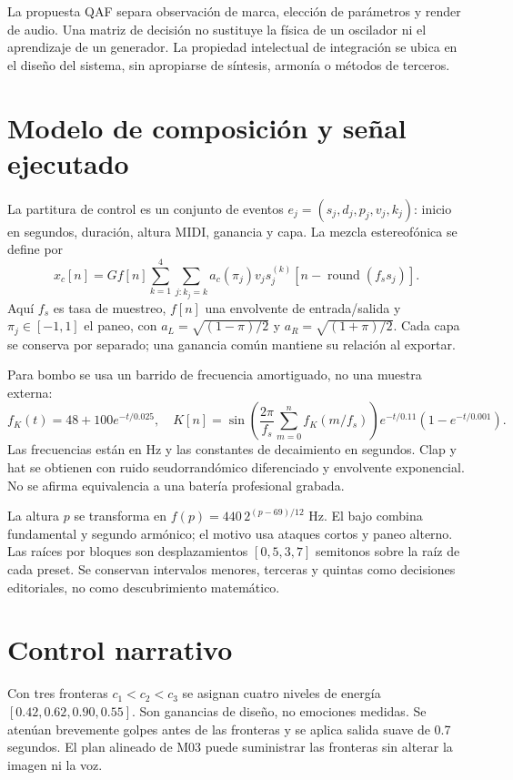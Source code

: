 \documentclass[11pt,a4paper]{article}
\begin{document}
La propuesta QAF separa observación de marca, elección de parámetros y render de audio. Una matriz de decisión no sustituye la física de un oscilador ni el aprendizaje de un generador. La propiedad intelectual de integración se ubica en el diseño del sistema, sin apropiarse de síntesis, armonía o métodos de terceros.

\newpage
\section{Modelo de composición y señal ejecutado}
La partitura de control es un conjunto de eventos $e_j=(s_j,d_j,p_j,v_j,k_j)$: inicio en segundos, duración, altura MIDI, ganancia y capa. La mezcla estereofónica se define por
\begin{equation}
 x_c[n]=G f[n]\sum_{k=1}^4\sum_{j:k_j=k}a_c(\pi_j)v_j
 s_j^{(k)}[n-\operatorname{round}(f_s s_j)].
\end{equation}
Aquí $f_s$ es tasa de muestreo, $f[n]$ una envolvente de entrada/salida y $\pi_j\in[-1,1]$ el paneo, con $a_L=\sqrt{(1-\pi)/2}$ y $a_R=\sqrt{(1+\pi)/2}$. Cada capa se conserva por separado; una ganancia común mantiene su relación al exportar.

Para bombo se usa un barrido de frecuencia amortiguado, no una muestra externa:
\begin{equation}
 f_K(t)=48+100e^{-t/0.025},\quad
 K[n]=\sin\!\left(\frac{2\pi}{f_s}\sum_{m=0}^{n}f_K(m/f_s)\right)e^{-t/0.11}(1-e^{-t/0.001}).
\end{equation}
Las frecuencias están en Hz y las constantes de decaimiento en segundos. Clap y hat se obtienen con ruido seudorrandómico diferenciado y envolvente exponencial. No se afirma equivalencia a una batería profesional grabada.

La altura $p$ se transforma en $f(p)=440\,2^{(p-69)/12}$ Hz. El bajo combina fundamental y segundo armónico; el motivo usa ataques cortos y paneo alterno. Las raíces por bloques son desplazamientos $[0,5,3,7]$ semitonos sobre la raíz de cada preset. Se conservan intervalos menores, terceras y quintas como decisiones editoriales, no como descubrimiento matemático.
\section{Control narrativo}
Con tres fronteras $c_1<c_2<c_3$ se asignan cuatro niveles de energía $[0.42,0.62,0.90,0.55]$. Son ganancias de diseño, no emociones medidas. Se atenúan brevemente golpes antes de las fronteras y se aplica salida suave de 0.7 segundos. El plan alineado de M03 puede suministrar las fronteras sin alterar la imagen ni la voz.
\end{document}
